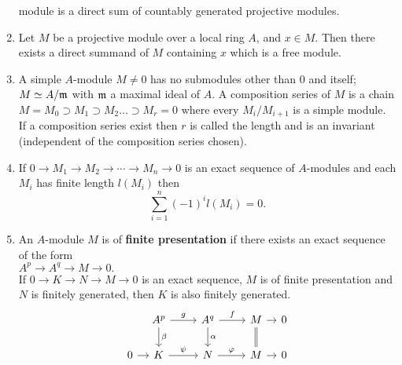\begin{enumerate}
            module is a direct sum of countably generated projective modules.
      \item
            Let $M$ be a projective module over a local ring $A$, and $x\in M$. Then there exists a direct summand of $M$
            containing $x$ which is a free module.
      \item
            A simple $A$-module $M\neq 0$ has no submodules other than $0$ and itself; $M\simeq A/\mathfrak{m}$ with $\mathfrak{m}$ a
            maximal ideal of $A$. A composition series of $M$ is a chain $M=M_0\supset M_1\supset M_2 \ldots\supset M_r=0$
            where every $M_i/M_{i+1}$ is a simple module. If a composition series exist then $r$ is called the length and is
            an invariant (independent of the composition series chosen).
      \item
            If $0\longrightarrow M_1\longrightarrow M_2\longrightarrow\cdots\longrightarrow M_n\longrightarrow 0$ is an
            exact sequence of $A$-modules and each $M_i$ has finite length $l(M_i)$ then
            $$\sum_{i=1}^n{(-1)^{i}l(M_i)}=0.$$
      \item
            An $A$-module $M$ is of \textbf{finite presentation} if there exists an exact sequence of the form\\
            \hspace*{10mm}$A^p\longrightarrow A^q\longrightarrow M \longrightarrow 0.$\\
            If $0\longrightarrow K\longrightarrow N\longrightarrow M\longrightarrow 0$ is an exact sequence, $M$ is of
            finite presentation and $N$ is finitely generated, then $K$ is also finitely generated.
            \begin{equation*}
                  \begin{tikzcd}
                        &[-1.5em] A^p \arrow[r, "g"] \arrow[d, "\beta"]
                        & A^q \arrow[d, "\alpha"] \arrow[r,"f"]
                        & M \ar[d,equal] \rar &[-1.5em] 0\\
                        0 \rar
                        & K \arrow[r, "\psi"]
                        & N \arrow[r,"\varphi"]
                        & M \rar & 0
                  \end{tikzcd}
            \end{equation*}

\end{enumerate}